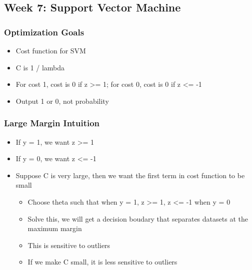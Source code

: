 \documentclass[]{article}
\providecommand{\tightlist}{%
  \setlength{\itemsep}{0pt}\setlength{\parskip}{0pt}}
\begin{document}
\hypertarget{week-7-support-vector-machine}{%
\subsection{Week 7: Support Vector
Machine}\label{week-7-support-vector-machine}}

\hypertarget{optimization-goals}{%
\subsubsection{Optimization Goals}\label{optimization-goals}}

\begin{itemize}
\tightlist
\item
  Cost function for SVM
\end{itemize}

\begin{itemize}
\tightlist
\item
  C is 1 / lambda
\item
  For cost 1, cost is 0 if z \textgreater{}= 1; for cost 0, cost is 0 if
  z \textless{}= -1
\item
  Output 1 or 0, not probability
\end{itemize}

\hypertarget{large-margin-intuition}{%
\subsubsection{Large Margin Intuition}\label{large-margin-intuition}}

\begin{itemize}
\tightlist
\item
  If y = 1, we want z \textgreater{}= 1
\item
  If y = 0, we want z \textless{}= -1
\item
  Suppose C is very large, then we want the first term in cost function
  to be small

  \begin{itemize}
  \tightlist
  \item
    Choose theta such that when y = 1, z \textgreater{}= 1, z
    \textless{}= -1 when y = 0
  \item
    Solve this, we will get a decision boudary that separates datasets
    at the maximum margin
  \item
    This is sensitive to outliers
  \item
    If we make C small, it is less sensitive to outliers
  \end{itemize}
\end{itemize}
\end{document}
